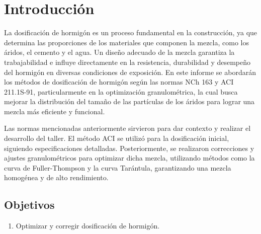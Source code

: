 \section{Introducción}

La dosificación de hormigón es un proceso fundamental en la construcción, ya que determina las proporciones de los materiales que componen la mezcla, como los áridos, el cemento y el agua. 
Un diseño adecuado de la mezcla garantiza la trabajabilidad e influye directamente en la resistencia, durabilidad y desempeño del hormigón en diversas condiciones de exposición. 
En este informe se abordarán los métodos de dosificación de hormigón según las normas NCh 163 y ACI 211.1S-91, particularmente en la optimización granulométrica, la cual busca mejorar la distribución del tamaño de las partículas de los áridos para lograr una mezcla más eficiente y funcional.

Las normas mencionadas anteriormente sirvieron para dar contexto y realizar el desarrollo del taller. El método ACI se utilizó para la dosificación inicial, siguiendo especificaciones detalladas. Posteriormente, se realizaron correcciones y ajustes granulométricos para optimizar dicha mezcla, utilizando métodos como la curva de Fuller-Thompson y la curva Tarántula, garantizando una mezcla homogénea y de alto rendimiento.

\subsection{Objetivos}

\begin{enumerate}
    \item Optimizar y corregir dosificación de hormigón.
\end{enumerate}